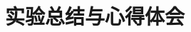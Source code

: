 \documentclass{../source/Experiment}
\begin{document}
            \subsubsection{}
            \subsubsection{}
            \subsubsection{}
            \subsubsection{}

    \section{实验总结与心得体会}
\end{document}

